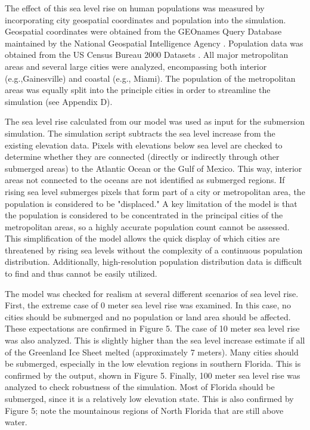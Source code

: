 \documentclass[12pt,a4paper,titlepage]{article}
\begin{document}
The effect of this sea level rise on human populations was
measured by incorporating city geospatial coordinates and
population into the simulation. Geospatial coordinates were
obtained from the GEOnames Query Database maintained by the
National Geospatial Intelligence Agency . Population data was
obtained from the US Census Bureau 2000 Datasets . All major
metropolitan areas and several large cities were analyzed,
encompassing both interior (e.g.,Gainesville) and coastal (e.g.,
Miami). The population of the metropolitan areas was equally split
into the principle cities in order to streamline the simulation
(see Appendix D).

The sea level rise calculated from our model was used as input for
the submersion simulation. The simulation script subtracts the sea
level increase from the existing elevation data. Pixels with
elevations below sea level are checked to determine whether they
are connected (directly or indirectly through other submerged
areas) to the Atlantic Ocean or the Gulf of Mexico. This way,
interior areas not connected to the oceans are not identified as
submerged regions. If rising sea level submerges pixels that form
part of a city or metropolitan area, the population is considered
to be "displaced." A key limitation of the model is that the
population is considered to be concentrated in the principal
cities of the metropolitan areas, so a highly accurate population
count cannot be assessed. This simplification of the model allows
the quick display of which cities are threatened by rising sea
levels without the complexity of a continuous population
distribution. Additionally, high-resolution population
distribution data is difficult to find and thus cannot be easily
utilized.

The model was checked for realism at several different scenarios
of sea level rise. First, the extreme case of 0 meter sea level
rise was examined. In this case, no cities should be submerged and
no population or land area should be affected. These expectations
are confirmed in Figure 5. The case of 10 meter sea level rise was
also analyzed. This is slightly higher than the sea level increase
estimate if all of the Greenland Ice Sheet melted (approximately 7
meters). Many cities should be submerged, especially in the low
elevation regions in southern Florida. This is confirmed by the
output, shown in Figure 5. Finally, 100 meter sea level rise was
analyzed to check robustness of the simulation. Most of Florida
should be submerged, since it is a relatively low elevation state.
This is also confirmed by Figure 5; note the mountainous regions
of North Florida that are still above water.
\end{document}
